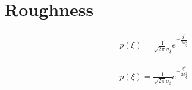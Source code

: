 
\newpage

\section{Roughness}

\begin{figure}[th]
\end{figure}

\begin{align}
p(\xi) = \frac{1}{\sqrt{2\pi}\sigma_{\!\xi}}e^{-\frac{\xi^2}{2\sigma_{\!\xi}^2}}
\end{align}


\begin{align}
p(\xi) = \frac{1}{\sqrt{2\pi}\sigma_{\!\xi}}e^{-\frac{\xi^2}{2\sigma_{\!\xi}^2}}
\end{align}

